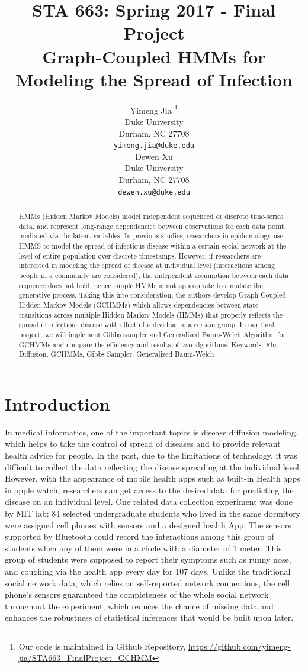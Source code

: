\documentclass{article} %
\title{STA 663: Spring 2017 - Final Project\\Graph-Coupled HMMs for Modeling the Spread of Infection}
\author{
Yimeng Jia \thanks{Our code is maintained in Github Repository, \textcolor{blue}{\url{https://github.com/yimeng-jia/STA663_FinalProject_GCHMM}}}\\
Duke University\\
Durham, NC 27708 \\
\texttt{yimeng.jia@duke.edu} \\
\And
Dewen Xu \\
Duke University \\
Durham, NC 27708 \\
\texttt{dewen.xu@duke.edu} \\
}
\begin{document}
\maketitle




\begin{abstract}
HMMs (Hidden Markov Models) model independent sequenced or discrete time-series data, and represent long-range dependencies between observations for each data point, mediated via the latent variables. In previous studies, researchers in epidemiology use HMMS to model the spread of infectious disease within a certain social network at the level of entire population over discrete timestamps. However, if researchers are interested in modeling the spread of disease at individual level (interactions among people in a community are considered), the independent assumption between each data sequence does not hold, hence simple HMMs is not appropriate to simulate the generative process. Taking this into consideration, the authors develop Graph-Coupled Hidden Markov Models (GCHMMs) which allows dependencies between state transitions across multiple Hidden Markov Models (HMMs) that properly reflects the spread of infectious disease with effect of individual in a certain group. In our final project, we will implement Gibbs sampler and Generalized Baum-Welch Algorithm for GCHMMs and compare the efficiency and results of two algorithms.
Keywords:  Flu Diffusion, GCHMMs, Gibbs Sampler, Generalized Baum-Welch
\end{abstract}

\section{Introduction}
In medical informatics, one of the important topics is disease diffusion modeling, which helps to take the control of spread of diseases and to provide relevant health advice for people. In the past, due to the limitations of technology, it was difficult to collect the data reflecting the disease spreading at the individual level. However, with the appearance of mobile health apps such as built-in Health apps in apple watch, researchers can get access to the desired data for predicting the disease on an individual level. One related data collection experiment was done by MIT lab: 84 selected undergraduate students who lived in the same dormitory were assigned cell phones with sensors and a designed health App. The sensors supported by Bluetooth could record the interactions among this group of students when any of them were in a circle with a diameter of 1 meter. This group of students were supposed to report their symptoms such as runny nose, and coughing via the health app every day for 107 days.  Unlike the traditional social network data, which relies on self-reported network connections, the cell phone’s sensors guaranteed the completeness of the whole social network throughout the experiment, which reduces the chance of missing data and enhances the robustness of statistical inferences that would be built upon later.	
\end{document}
